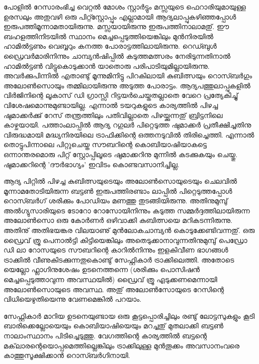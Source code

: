 പോളില്‍ റേസാരംഭിച്ച വെറ്റല്‍ മോശം സ്റ്റാര്‍ട്ടും മസ്സയുടെ ഫെറാരിയുമായുള്ള ഉരസലും അതുവഴി ഒരു പിറ്റ്സ്റ്റോപ്പും എല്ലാമായി 
ആദ്യലാപ്പുകഴിഞ്ഞപ്പോള്‍ ഇരുപത്തിമൂന്നാമതായിരുന്നു. മസ്സയായിരുന്നു ഇരുപത്തിനാലാമതു്. ഈ ബഹളത്തിനിടയില്‍ സ്ഥാനം 
മെച്ചപ്പെടുത്തിയെങ്കിലും മുന്‍നിരയില്‍ ഹാമില്‍ട്ടണും വെബ്ബറും കനത്ത പോരാട്ടത്തിലായിരുന്നു. റെഡ്ബുള്‍ ഡ്രൈവര്‍മാരിനിന്നും
 ചാമ്പ്യന്‍ഷിപ്പില്‍ കടുത്തമത്സരം നേരിടുന്നതിനാല്‍ ഹാമില്‍ട്ടണ്‍ വിട്ടുകൊടുക്കാന്‍ യാതൊരു പരിപാടിയുമില്ലായിരുന്നു. അവര്‍ക്കുപിന്നില്‍ 
 എതാണ്ടു് മൂന്നുമിനിട്ടു പിറകിലായി കുബിത്സയും റൊസ്ബര്‍ഗും അലോണ്‍സൊയും തമ്മിലായിരുന്നു അടുത്ത പോരാട്ടം. 
 ആദ്യപത്തുലാപ്പുകളില്‍ വിര്‍ജിനിന്റെ ലൂകാസ് ഡി ഗ്രാസ്സി റിട്ടയര്‍ചെയ്തതല്ലാതെ വേറെ പ്രത്യേകിച്ചു് വിശേഷമൊന്നുമുണ്ടായില്ല. 
 എന്നാല്‍ ടയറുകളുടെ കാര്യത്തില്‍ പിഴച്ച ഷുമാക്കര്‍ക്കു് റേസ് തന്ത്രത്തിലും പതിവില്ലാതെ പിഴയ്ക്കുന്നതു് ബ്രിട്ടനിലെ കാഴ്ചയായി. 
 പത്താംലാപ്പില്‍ ആദ്യ റഗുലര്‍ പിറ്റെടുത്ത ഷുമാക്കര്‍ പ്രതീക്ഷിച്ചതിനു വിരുദ്ധമായി മദ്ധ്യനിരയിലെ ട്രാഫിക്കിന്റെ ഒത്തനടുവില്‍ 
 തിരിച്ചെത്തി. എന്നാല്‍ തൊട്ടുപിന്നാലെ പിറ്റുചെയ്ത സൗബറിന്റെ കൊബിയാഷിയാകട്ടെ ഒന്നാന്തരമൊരു പിറ്റ് സ്റ്റോപ്പിലൂടെ 
 ഷുമാക്കറിനു മുന്നില്‍ കടക്കുകയും ചെയ്തു. ഷുമാക്കറിന്റെ 'ദൗര്‍ഭാഗ്യം' ഇവിടം കൊണ്ടവസാനിച്ചില്ല.

ആദ്യ പിറ്റില്‍ പിഴച്ച കുബിത്സയുടെയും അലോണ്‍സൊയുടെയും ചെലവില്‍ മൂന്നാമതോടിയിരുന്ന ബട്ടണ്‍ ഇരുപത്തിരണ്ടാം ലാപ്പില്‍ 
പിറ്റെടുത്തപ്പോള്‍ റൊസ്ബര്‍ഗ് ശരിക്കും പോഡിയം മണത്തു തുടങ്ങിയിരുന്നു. അതിനുമുമ്പു് അല്‍ഗ്യുസാരിയുടെ ടോറോ റോസോയിനിന്നും കടുത്ത സമ്മര്‍ദ്ദത്തിലായിരുന്ന അലോണ്‍സൊ ഒരു കോര്‍ണര്‍ ഒഴിവാക്കി കുബിത്സയെ മറികടന്നിരുന്നു. അതിനു് അതിഭയങ്കര 
വിലയാണു് മുന്‍ലോകചാമ്പ്യന്‍ കൊടുക്കേണ്ടിവന്നതു്. ഒരു ഡ്രൈവ് ത്രൂ പെനാല്‍ട്ടി കിട്ടിയെങ്കിലും അതെടുക്കാനാവുന്നതിനുമുമ്പു് 
പെഡ്രോ ഡി ലാ റോസയുടെ സൗബറിന്റെ കാറില്‍നിന്നും ഇളകിവീണ ഭാഗങ്ങള്‍ ട്രാക്കില്‍ വീണുകിടക്കുന്നതുകൊണ്ടു് സേഫ്റ്റികാര്‍ 
ട്രാക്കിലെത്തി. അതോടെ യെല്ലോ ഫ്ലാഗിനുശേഷം ഉടനെത്തന്നെ (ശരിക്കും പൊസിഷന്‍ മെച്ചപ്പെടുത്താവുന്ന അവസ്ഥയില്‍) 
ഡ്രൈവ് ത്രൂ എടുക്കണമെന്നായി അലോണ്‍സൊയുടെ അവസ്ഥ. അതു് അലോണ്‍സോയുടെ റേസിന്റെ വിധിയെഴുതിയെന്നു വേണമെങ്കില്‍ പറയാം.

സേഫ്റ്റികാര്‍ മാറിയ ഉടനെയുണ്ടായ ഒരു കൂട്ടപ്പൊരിച്ചിലും രണ്ടു് ലോട്ടസുകളും കൂടി ബാരിക്കെല്ലോയെയും കൊബിയാഷിയെയും മറച്ചതു്
 മുതലാക്കി ബട്ടണ്‍ നാലാംസ്ഥാനം പിടിച്ചെടുത്തു. വേഗത്തിന്റെ കാര്യത്തില്‍ ബട്ടന്റെ മക്‌ലാരന്റെയൊപ്പമെത്തില്ലെങ്കിലും ട്രാക്കിലുള്ള 
 മുന്‍തൂക്കം അവസാനംവരെ കാത്തുസൂക്ഷിക്കാന്‍ റൊസ്ബര്‍ഗിനായി.

